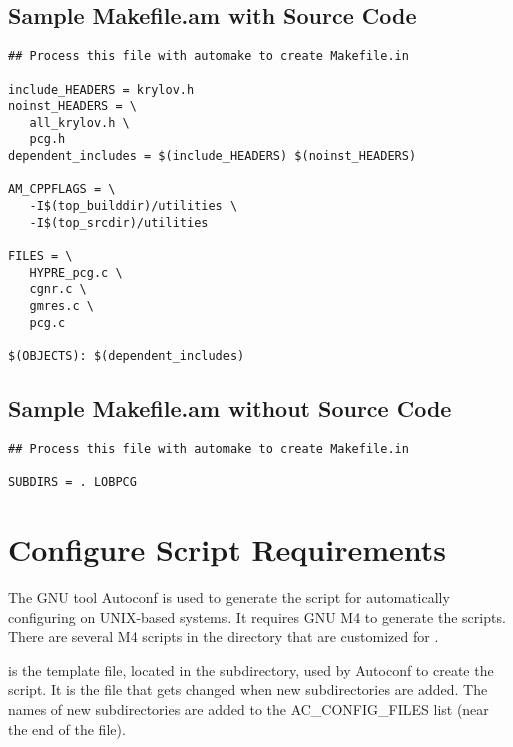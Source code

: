 \subsection{Sample Makefile.am with Source Code}
\label{Sample Makefile.am with Source Code}

\begin{verbatim}
## Process this file with automake to create Makefile.in

include_HEADERS = krylov.h
noinst_HEADERS = \
   all_krylov.h \
   pcg.h
dependent_includes = $(include_HEADERS) $(noinst_HEADERS)

AM_CPPFLAGS = \
   -I$(top_builddir)/utilities \
   -I$(top_srcdir)/utilities 

FILES = \
   HYPRE_pcg.c \
   cgnr.c \
   gmres.c \
   pcg.c

$(OBJECTS): $(dependent_includes)

\end{verbatim}

\subsection{Sample Makefile.am without Source Code}
\label{Sample Makefile.am without Source Code}

\begin{verbatim}
## Process this file with automake to create Makefile.in

SUBDIRS = . LOBPCG

\end{verbatim}

\section{Configure Script Requirements}
\label{Configure Script Requirements}


The GNU tool Autoconf is used to generate the  script for automatically
configuring \hypre{} on UNIX-based systems.  It requires GNU M4 to generate the
scripts.  There are several M4 scripts in the  directory
that are customized for \hypre{}.

\file{configure.ac} is the template file, located in the  subdirectory, used 
by Autoconf to create the  script.  It is the file that gets changed
when new subdirectories are added.  The names of new subdirectories are added to
the AC\_CONFIG\_FILES list (near the end of the file).

